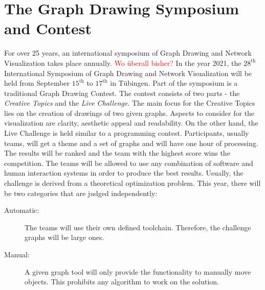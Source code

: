 \section{The Graph Drawing Symposium and Contest}
For over 25 years, an international symposium of Graph Drawing and Network Visualization takes place annually. \textcolor{red}{Wo überall bisher?} In the year 2021, the $28^{\text{th}}$ International Symposium of Graph Drawing and Network Visualization will be held from September $15^{\text{th}}$ to $17^{\text{th}}$ in Tübingen. 
\newline Part of the symposium is a traditional Graph Drawing Contest. The contest consists of two parts - the \textit{Creative Topics} and the \textit{Live Challenge}. The main focus for the Creative Topics lies on the creation of drawings of two given graphs. Aspects to consider for the visualization are clarity, aesthetic appeal and readability.
\newline On the other hand, the Live Challenge is held similar to a programming contest. Participants, usually teams, will get a theme and a set of graphs and will have one hour of processing. The results will be ranked and the team with the highest score wins the competition. The teams will be allowed to use any combination of software and human interaction systems in order to produce the best results. Usually, the challenge is derived from a theoretical optimization problem.
\newline This year, there will be two categories that are judged independently:
\begin{description}
	\item[Automatic:] The teams will use their own defined toolchain. Therefore, the challenge graphs will be large ones.
	\item[Manual:] A given graph tool will only provide the  functionality to manually move objects. This prohibits any algorithm to work on the solution.
\end{description}